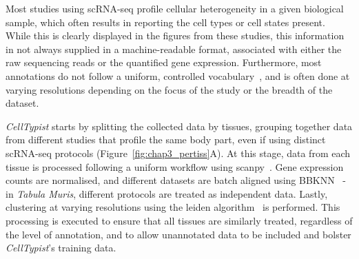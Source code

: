 Most studies using scRNA-seq profile cellular heterogeneity in a given biological sample, which often results in reporting the cell types or cell states present. While this is clearly displayed in the figures from these studies, this information in not always supplied in a machine-readable format, associated with either the raw sequencing reads or the quantified gene expression. Furthermore, most annotations do not follow a uniform, controlled vocabulary~\citep{bard_ontology_2005}, and is often done at varying resolutions depending on the focus of the study or the breadth of the dataset.

\textit{CellTypist} starts by splitting the collected data by tissues, grouping together data from different studies that profile the same body part, even if using distinct scRNA-seq protocols (Figure~\ref{fig:chap3_pertiss}A). At this stage, data from each tissue is processed following a uniform workflow using scanpy~\citep{wolf_scanpy:_2018}. Gene expression counts are normalised, and different datasets are batch aligned using BBKNN~\citep{polanski_bbknn:_2019} - in \textit{Tabula Muris}, different protocols are treated as independent data. Lastly, clustering at varying resolutions using the leiden algorithm~\citep{traag_louvain_2019} is performed. This processing is executed to ensure that all tissues are similarly treated, regardless of the level of annotation, and to allow unannotated data to be included and bolster \textit{CellTypist}'s training data.

